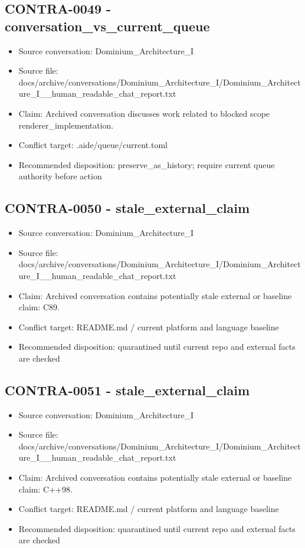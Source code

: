 \documentclass[11pt,a4paper]{report}
\begin{document}
\subsection{CONTRA-0049 - conversation\_vs\_current\_queue}

\begin{itemize}
\item Source conversation: Dominium\_Architecture\_I
\item Source file: docs/archive/conversations/Dominium\_Architecture\_I/Dominium\_Architecture\_I\_\_human\_readable\_chat\_report.txt
\item Claim: Archived conversation discusses work related to blocked scope renderer\_implementation.
\item Conflict target: .aide/queue/current.toml
\item Recommended disposition: preserve\_as\_history; require current queue authority before action
\end{itemize}

\subsection{CONTRA-0050 - stale\_external\_claim}

\begin{itemize}
\item Source conversation: Dominium\_Architecture\_I
\item Source file: docs/archive/conversations/Dominium\_Architecture\_I/Dominium\_Architecture\_I\_\_human\_readable\_chat\_report.txt
\item Claim: Archived conversation contains potentially stale external or baseline claim: C89.
\item Conflict target: README.md / current platform and language baseline
\item Recommended disposition: quarantined until current repo and external facts are checked
\end{itemize}

\subsection{CONTRA-0051 - stale\_external\_claim}

\begin{itemize}
\item Source conversation: Dominium\_Architecture\_I
\item Source file: docs/archive/conversations/Dominium\_Architecture\_I/Dominium\_Architecture\_I\_\_human\_readable\_chat\_report.txt
\item Claim: Archived conversation contains potentially stale external or baseline claim: C++98.
\item Conflict target: README.md / current platform and language baseline
\item Recommended disposition: quarantined until current repo and external facts are checked
\end{itemize}
\end{document}
